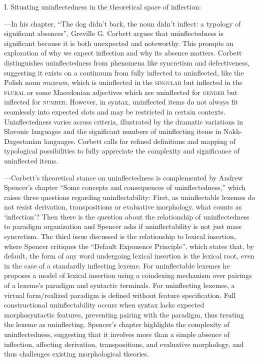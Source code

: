 \documentclass[output=paper]{langscibook}
\begin{document}
\noindent I. Situating uninflectedness in the theoretical space of inflection:

\medskip

---In his chapter, ``The dog didn't bark, the noun didn't inflect: a typology of significant absences'', Greville G. Corbett argues that uninflectedness is significant because it is both unexpected and noteworthy. This prompts an exploration of why we expect inflection and why its absence matters. Corbett distinguishes uninflectedness from phenomena like syncretism and defectiveness, suggesting it exists on a continuum from fully inflected to uninflected, like the Polish noun \emph{muzeum}, which is uninflected in the \textsc{singular} but inflected in the \textsc{plural} or some Macedonian adjectives which are uninflected for \textsc{gender} but inflected for \textsc{number}. However, in syntax, uninflected items do not always fit seamlessly into expected slots and may be restricted in certain contexts. Uninflectedness varies across criteria, illustrated by the dramatic variations in Slavonic languages and the significant numbers of uninflecting items in Nakh-Dagestanian languages. Corbett calls for refined definitions and mapping of typological possibilities to fully appreciate the complexity and significance of uninflected items.

---Corbett's theoretical stance on uninflectedness is complemented by Andrew Spencer's chapter ``Some concepts and consequences of uninflectedness,'' which raises three questions regarding uninflectability: First, as uninflectable lexemes do not resist derivation, transpositions or evaluative morphology. what counts as `inflection'? Then there is the question about the relationship of uninflectedness to paradigm organization and Spencer asks if uninflectability is not just mass syncretism. The third issue discussed is the relationship to lexical insertion, where Spencer critiques the ``Default Exponence Principle'', which states that, by default, the form of any word undergoing lexical insertion is the lexical root, even in the case of a standardly inflecting lexeme. For uninflectable lexemes he proposes a model of lexical insertion using a coindexing mechanism over pairings of a lexeme's paradigm and syntactic terminals. For uninflecting lexemes, a virtual form/realized paradigm is defined without feature specification. Full constructional uninflectability occurs when syntax lacks expected morphosyntactic features, preventing pairing with the paradigm, thus treating the lexeme as uninflecting. Spencer's chapter highlights the complexity of uninflectedness, suggesting that it involves more than a simple absence of inflection,
affecting derivation, transpositions, and evaluative morphology, and thus challenges existing morphological theories.
\end{document}
